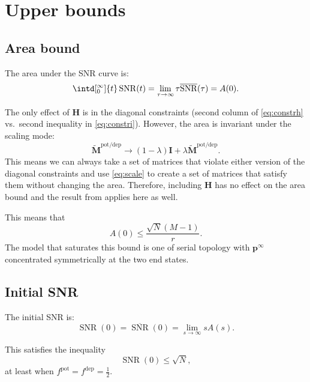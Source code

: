 \documentclass[12pt]{article}
\newcommand{\I}{\mathbf{I}}
\newcommand{\pr}{\mathbf{p}}
\newcommand{\eq}{\pr^\infty}
\newcommand{\M}{\mathbf{M}}
\newcommand{\pot}{^{\text{pot}}}
\newcommand{\dep}{^{\text{dep}}}
\newcommand{\potdep}{^{\text{pot/dep}}}
\renewcommand{\hom}{\mathbf{H}}
\newcommand{\Mh}{\widetilde{\M}}
\DeclareMathOperator{\snr}{SNR}
\newcommand{\snrb}{\overline{\snr}}
\begin{document}
\section{Upper bounds}\label{sec:upperbnds}



\subsection{Area bound}\label{sec:area}

The area under the SNR curve is:
%
\begin{equation}\label{eq:areadef}
  \intd[_0^\infty]{t} \snr(t) = \lim_{\tau\to\infty} \tau \snrb(\tau) = A(0).
\end{equation}
%

The only effect of $\hom$ is in the diagonal constraints (second column of \eqref{eq:constrh} vs.\ second inequality in \eqref{eq:constri}).
However, the area is invariant under the scaling mode:
%
\begin{equation}\label{eq:scale}
  \Mh\potdep  \to (1-\lambda)\I + \lambda \Mh\potdep .
\end{equation}
%
This means we can always take a set of matrices that violate either version of the diagonal constraints and use \eqref{eq:scale} to create a set of matrices that satisfy them without changing the area.
Therefore, including $\hom$ has no effect on the area bound and the result from \cite{Lahiri2013synapse} applies here as well.

This means that
%
\begin{equation}\label{eq:areabnd}
  A(0) \leq \frac{\sqrt{N}(M-1)}{r}.
\end{equation}
%
The model that saturates this bound is one of serial topology with $\eq$ concentrated symmetrically at the two end states.



\subsection{Initial SNR}\label{sec:initial}

The initial SNR is:
%
\begin{equation}\label{eq:initdef}
  \snr(0) = \snrb(0) = \lim_{s\to\infty} sA(s).
\end{equation}
%

This satisfies the inequality
%
\begin{equation}\label{eq:initbnd}
  \snr(0) \leq \sqrt{N},
\end{equation}
%
at least when $f\pot=f\dep=\frac{1}{2}$.
\end{document}
